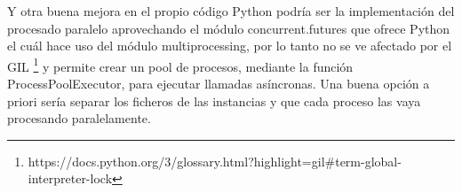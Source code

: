 Y otra buena mejora en el propio código Python podría ser la implementación del procesado paralelo aprovechando el módulo concurrent.futures que ofrece Python el cuál hace uso del módulo multiprocessing, por lo tanto no se ve afectado por el \gls{GIL} \footnote{https://docs.python.org/3/glossary.html?highlight=gil#term-global-interpreter-lock} y permite crear un pool de procesos, mediante la función ProcessPoolExecutor, para ejecutar llamadas asíncronas. Una buena opción a priori sería separar los ficheros de las instancias y que cada proceso las vaya procesando paralelamente.

